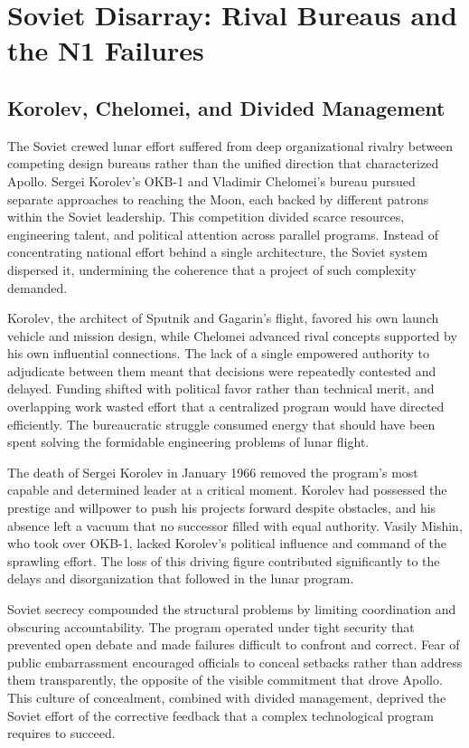 \section{Soviet Disarray: Rival Bureaus and the N1 Failures}

\subsection{Korolev, Chelomei, and Divided Management}
The Soviet crewed lunar effort suffered from deep organizational rivalry between competing design bureaus rather than the unified direction that characterized Apollo. Sergei Korolev's OKB-1 and Vladimir Chelomei's bureau pursued separate approaches to reaching the Moon, each backed by different patrons within the Soviet leadership. This competition divided scarce resources, engineering talent, and political attention across parallel programs. Instead of concentrating national effort behind a single architecture, the Soviet system dispersed it, undermining the coherence that a project of such complexity demanded.

Korolev, the architect of Sputnik and Gagarin's flight, favored his own launch vehicle and mission design, while Chelomei advanced rival concepts supported by his own influential connections. The lack of a single empowered authority to adjudicate between them meant that decisions were repeatedly contested and delayed. Funding shifted with political favor rather than technical merit, and overlapping work wasted effort that a centralized program would have directed efficiently. The bureaucratic struggle consumed energy that should have been spent solving the formidable engineering problems of lunar flight.

The death of Sergei Korolev in January 1966 removed the program's most capable and determined leader at a critical moment. Korolev had possessed the prestige and willpower to push his projects forward despite obstacles, and his absence left a vacuum that no successor filled with equal authority. Vasily Mishin, who took over OKB-1, lacked Korolev's political influence and command of the sprawling effort. The loss of this driving figure contributed significantly to the delays and disorganization that followed in the lunar program.

Soviet secrecy compounded the structural problems by limiting coordination and obscuring accountability. The program operated under tight security that prevented open debate and made failures difficult to confront and correct. Fear of public embarrassment encouraged officials to conceal setbacks rather than address them transparently, the opposite of the visible commitment that drove Apollo. This culture of concealment, combined with divided management, deprived the Soviet effort of the corrective feedback that a complex technological program requires to succeed.

